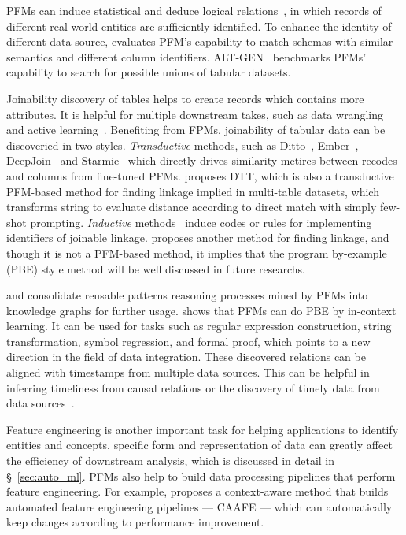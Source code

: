   PFMs can induce statistical and deduce logical relations~\cite{Wang2023SoloDD, CHORUS, constructKG,KGobjectrecognition,tabulargeneration, entityresolution}, in which records of different real world entities are sufficiently identified. To enhance the identity of different data source, \cite{LLMschema} evaluates PFM's capability to match schemas with similar semantics and different column identifiers. ALT-GEN~\cite{tabulargeneration} benchmarks PFMs' capability to search for possible unions of tabular datasets.
  
  Joinability discovery of tables helps to create records which contains more attributes. It is helpful for multiple downstream takes, such as data wrangling~\cite{FMwrangling} and active learning~\cite{ActiveLearning}. Benefiting from FPMs, joinability of tabular data can be discoveried in two styles. \textit{Transductive} methods, such as Ditto~\cite{Ditto}, Ember~\cite{Ember}, DeepJoin~\cite{DeepJoin} and Starmie~\cite{Starmie} which directly drives similarity metircs between recodes and columns from fine-tuned PFMs. \cite{Nobari2023DTTAE} proposes DTT, which is also a transductive PFM-based method for finding linkage implied in multi-table datasets, which transforms string to evaluate distance according to direct match with simply few-shot prompting. \textit{Inductive} methods~\cite{jain2022jigsaw, lyu2024automatic} induce codes or rules for implementing identifiers of joinable linkage. \cite{zuo2022spine} proposes another method for finding linkage, and though it is not a PFM-based method, it implies that the program by-example (PBE) style method will be well discussed in future researchs. 
  
  \cite{constructKG} and \cite{KGobjectrecognition} consolidate reusable patterns reasoning processes mined by PFMs into knowledge graphs for further usage. \cite{Li2024IsPB} shows that PFMs can do PBE by in-context learning. It can be used for tasks such as regular expression construction, string transformation, symbol regression, and formal proof, which points to a new direction in the field of data integration. These discovered relations can be aligned with timestamps from multiple data sources. This can be helpful in inferring timeliness from causal relations or the discovery of timely data from data sources~\cite{Wang2023SoloDD}.
  
  Feature engineering is another important task for helping applications to identify entities and concepts, specific form and representation of data can greatly affect the efficiency of downstream analysis, which is discussed in detail in \S~\ref{sec:auto_ml}. PFMs also help to build data processing pipelines that perform feature engineering. For example, \cite{Hollmann2023LargeLM} proposes a context-aware method that builds automated feature engineering pipelines — CAAFE — which can automatically keep changes according to performance improvement.

